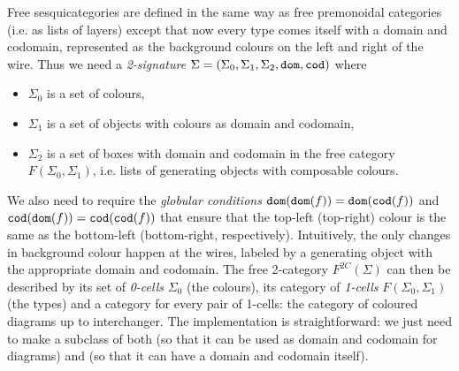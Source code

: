 Free sesquicategories are defined in the same way as free premonoidal categories (i.e. as lists of layers) except that now every type comes itself with a domain and codomain, represented as the background colours on the left and right of the wire.
Thus we need a \emph{2-signature} $\Sigma = (\Sigma_0, \Sigma_1, \Sigma_2, \mathtt{dom}, \mathtt{cod})$ where
\begin{itemize}
    \item $\Sigma_0$ is a set of colours,
    \item $\Sigma_1$ is a set of objects with colours as domain and codomain,
    \item $\Sigma_2$ is a set of boxes with domain and codomain in the free category $F(\Sigma_0, \Sigma_1)$, i.e. lists of generating objects with composable colours.
\end{itemize}
We also need to require the \emph{globular conditions} $\mathtt{dom}(\mathtt{dom}(f)) = \mathtt{dom}(\mathtt{cod}(f))$ and $\mathtt{cod}(\mathtt{dom}(f)) = \mathtt{cod}(\mathtt{cod}(f))$ that ensure that the top-left (top-right) colour is the same as the bottom-left (bottom-right, respectively).
Intuitively, the only changes in background colour happen at the wires, labeled by a generating object with the appropriate domain and codomain.
The free 2-category $F^{2C}(\Sigma)$ can then be described by its set of \emph{0-cells} $\Sigma_0$ (the colours), its category of \emph{1-cells} $F(\Sigma_0, \Sigma_1)$ (the types) and a category for every pair of 1-cells: the category of coloured diagrams up to interchanger.
The implementation is straightforward: we just need to make  a subclass of both  (so that it can be used as domain and codomain for diagrams) and  (so that it can have a domain and codomain itself).

